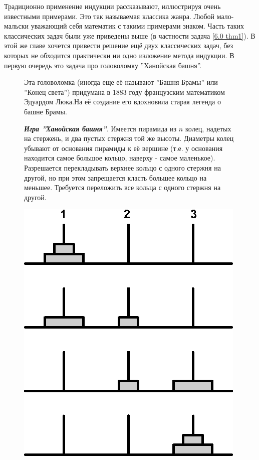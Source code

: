 Традиционно применение индукции рассказывают, иллюстрируя очень известными примерами. Это так называемая классика жанра. Любой мало-мальски уважающий себя математик с такими примерами знаком. Часть таких классических задач были уже приведены выше (в частности задача \ref{6.0 thm1}). В этой же главе хочется привести решение ещё двух классических задач, без которых не обходится практически ни одно изложение метода индукции. В первую очередь это задача про головоломку ''Ханойская башня''.
{\setlength{\intextsep}{2pt}
\begin{figure}[h]
\begin{minipage}{0.69\linewidth}\setlength{\parindent}{1.5em}
Эта головоломка (иногда еще её называют ''Башня Брамы'' или ''Конец света'') придумана в 1883 году французским математиком Эдуардом Люка.\footnotemark На её создание его вдохновила старая легенда о
башне Брамы.
\par
\textbf{\textit{Игра ''Ханойская башня''}}. Имеется пирамида из $n$ колец, надетых на стержень, и два пустых стержня той же высоты. Диаметры колец убывают от основания пирамиды к её вершине (т.е. у основания находится самое большое кольцо, наверху - самое маленькое). Разрешается перекладывать верхнее кольцо с одного стержня на другой, но при этом запрещается класть большее кольцо на меньшее. Требуется переложить все кольца с одного стержня на другой.
\end{minipage}
\hfill
\begin{minipage}{0.25\linewidth}
    \includegraphics[width=0.95\columnwidth]{img/sobor_2.png}

\end{minipage}
\end{figure}}
